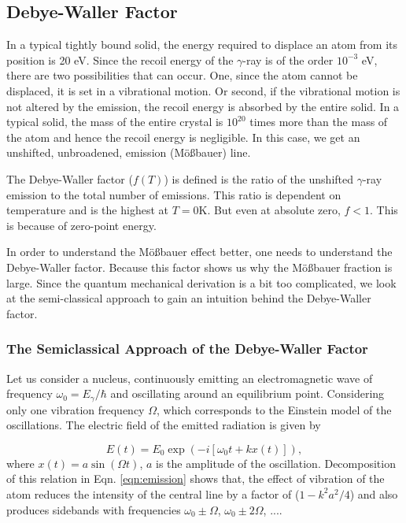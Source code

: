 \documentclass[a4paper]{report}
\numberwithin{equation}{section}
\begin{document}
\subsection{Debye-Waller Factor}
In a typical tightly bound solid, the energy required to displace an atom from its position is 20 eV. Since the recoil energy of the $\gamma$-ray is of the order $10^{-3}$ eV, there are two possibilities that can occur. One, since the atom cannot be displaced, it is set in a vibrational motion. Or second, if the vibrational motion is not altered by the emission, the recoil energy is absorbed by the entire solid. In a typical solid, the mass of the entire crystal is $10^{20}$ times more than the mass of the atom and hence the recoil energy is negligible. In this case, we get an unshifted, unbroadened, emission (M\"o{\ss}bauer) line. 

The Debye-Waller factor ($f(T)$) is defined is the ratio of the unshifted $\gamma$-ray emission to the total number of emissions. This ratio is dependent on temperature and is the highest at $T = 0 \si{\kelvin}$. But even at absolute zero, $f < 1$. This is because of zero-point energy. 

In order to understand the M\"o{\ss}bauer effect better, one needs to understand the Debye-Waller factor. Because this factor shows us why the M\"o{\ss}bauer fraction is large. Since the quantum mechanical derivation is a bit too complicated, we look at the semi-classical approach to gain an intuition behind the Debye-Waller factor.

\subsubsection{The Semiclassical Approach of the Debye-Waller Factor}
Let us consider a nucleus, continuously emitting an electromagnetic wave of frequency $\omega_{0} = E_{\gamma}/\hbar $ and oscillating around an equilibrium point. Considering only one vibration frequency $\Omega$, which corresponds to the Einstein model of the oscillations. The electric field of the emitted radiation is given by

\begin{equation} \label{eqn:emission}
		E(t) = E_{0} \exp\left(- i [\omega_{0} t + k x(t) ] \right),
\end{equation}
where $x(t) = a \sin (\Omega t)$, $a$ is the amplitude of the oscillation. Decomposition of this relation in Eqn. \ref{eqn:emission} shows that, the effect of vibration of the atom reduces the intensity of the central line by a factor of ($1 - k^2 a^2 / 4$) and also produces sidebands with frequencies $\omega_{0} \pm \Omega$, $\omega_{0} \pm 2 \Omega$, .... 
\end{document}
